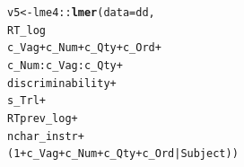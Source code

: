 \documentclass[a4paper,12pt,twoside]{article}\usepackage[]{graphicx}\usepackage[]{color}
\makeatletter
\newcommand{\hlnum}[1]{\textcolor[rgb]{0.686,0.059,0.569}{#1}}%
\newcommand{\hlopt}[1]{\textcolor[rgb]{0,0,0}{#1}}%
\newcommand{\hlstd}[1]{\textcolor[rgb]{0.345,0.345,0.345}{#1}}%
\newcommand{\hlkwb}[1]{\textcolor[rgb]{0.69,0.353,0.396}{#1}}%
\newcommand{\hlkwc}[1]{\textcolor[rgb]{0.333,0.667,0.333}{#1}}%
\newcommand{\hlkwd}[1]{\textcolor[rgb]{0.737,0.353,0.396}{\textbf{#1}}}%
\newenvironment{kframe}{%
 \def\at@end@of@kframe{}%
 \ifinner\ifhmode%
  \def\at@end@of@kframe{\end{minipage}}%
  \begin{minipage}{\columnwidth}%
 \fi\fi%
 \def\FrameCommand##1{\hskip\@totalleftmargin \hskip-\fboxsep
 \colorbox{shadecolor}{##1}\hskip-\fboxsep
     \hskip-\linewidth \hskip-\@totalleftmargin \hskip\columnwidth}%
 \MakeFramed {\advance\hsize-\width
   \@totalleftmargin\z@ \linewidth\hsize
   \@setminipage}}%
 {\par\unskip\endMakeFramed%
 \at@end@of@kframe}
\newenvironment{knitrout}{}{} %
\makeatother
\begin{document}
\begin{knitrout}\scriptsize
{}\color{fgcolor}\begin{kframe}
\begin{alltt}
\hlstd{v5} \hlkwb{<-} \hlstd{lme4}\hlopt{::}\hlkwd{lmer}\hlstd{(}\hlkwc{data}\hlstd{=dd,}
                 \hlstd{RT_log} \hlopt{~}
                   \hlstd{c_Vag} \hlopt{+} \hlstd{c_Num} \hlopt{+} \hlstd{c_Qty} \hlopt{+} \hlstd{c_Ord} \hlopt{+}
                   \hlstd{c_Num}\hlopt{:}\hlstd{c_Vag}\hlopt{:}\hlstd{c_Qty} \hlopt{+}
                   \hlstd{discriminability} \hlopt{+}
                   \hlstd{s_Trl} \hlopt{+}
                   \hlstd{RTprev_log} \hlopt{+}
                   \hlstd{nchar_instr} \hlopt{+}
                   \hlstd{(}\hlnum{1}\hlopt{+}\hlstd{c_Vag} \hlopt{+} \hlstd{c_Num} \hlopt{+} \hlstd{c_Qty} \hlopt{+} \hlstd{c_Ord}\hlopt{|}\hlstd{Subject))}
\end{alltt}
\end{kframe}
\end{knitrout}
\end{document}
